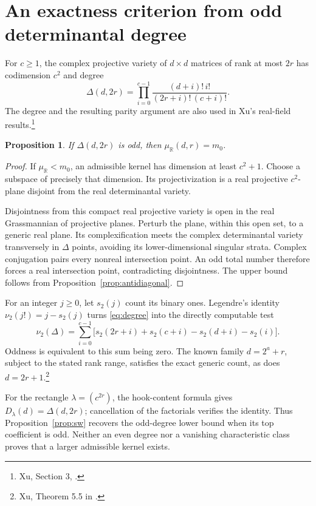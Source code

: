 \documentclass[11pt]{article}
\newtheorem{proposition}[theorem]{Proposition}
\theoremstyle{definition}
\newcommand{\R}{\mathbb R}
\newcommand{\muR}{\mu_{\R}}
\newcommand{\val}{\nu_2}
\begin{document}
\section{An exactness criterion from odd determinantal degree}\label{sec:degree}
For $c\geq1$, the complex projective variety of $d\times d$ matrices of rank at most $2r$ has codimension $c^2$ and degree
\begin{equation}\label{eq:degree}
 \Delta(d,2r)=\prod_{i=0}^{c-1}
 \frac{(d+i)!\,i!}{(2r+i)!\,(c+i)!}.
\end{equation}
The degree and the resulting parity argument are also used in Xu's real-field results.\footnote{Xu, Section 3, \cite{xu}.}

\begin{proposition}\label{prop:odddegree}
If $\Delta(d,2r)$ is odd, then $\muR(d,r)=m_0$.
\end{proposition}
\begin{proof}
If $\muR<m_0$, an admissible kernel has dimension at least $c^2+1$. Choose a subspace of precisely that dimension. Its projectivization is a real projective $c^2$-plane disjoint from the real determinantal variety.

Disjointness from this compact real projective variety is open in the real Grassmannian of projective planes. Perturb the plane, within this open set, to a generic real plane. Its complexification meets the complex determinantal variety transversely in $\Delta$ points, avoiding its lower-dimensional singular strata. Complex conjugation pairs every nonreal intersection point. An odd total number therefore forces a real intersection point, contradicting disjointness. The upper bound follows from Proposition~\ref{prop:antidiagonal}.
\end{proof}

For an integer $j\geq0$, let $s_2(j)$ count its binary ones. Legendre's identity $\val(j!)=j-s_2(j)$ turns \eqref{eq:degree} into the directly computable test
\begin{equation}\label{eq:degreebinary}
 \val(\Delta)=\sum_{i=0}^{c-1}
 \big[s_2(2r+i)+s_2(c+i)-s_2(d+i)-s_2(i)\big].
\end{equation}
Oddness is equivalent to this sum being zero. The known family $d=2^a+r$, subject to the stated rank range, satisfies the exact generic count, as does $d=2r+1$.\footnote{Xu, Theorem 5.5 in \cite{survey}.}

For the rectangle $\lambda=(c^{2r})$, the hook-content formula gives $D_\lambda(d)=\Delta(d,2r)$; cancellation of the factorials verifies the identity. Thus Proposition~\ref{prop:sw} recovers the odd-degree lower bound when its top coefficient is odd. Neither an even degree nor a vanishing characteristic class proves that a larger admissible kernel exists.
\end{document}
